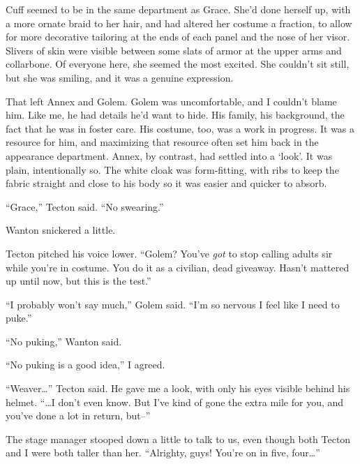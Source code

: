 Cuff seemed to be in the same department as Grace.  She'd done herself up, with a more ornate braid to her hair, and had altered her costume a fraction, to allow for more decorative tailoring at the ends of each panel and the nose of her visor.  Slivers of skin were visible between some slats of armor at the upper arms and collarbone.  Of everyone here, she seemed the most excited.  She couldn't sit still, but she was smiling, and it was a genuine expression.



That left Annex and Golem.  Golem was uncomfortable, and I couldn't blame him.  Like me, he had details he'd want to hide.  His family, his background, the fact that he was in foster care.  His costume, too, was a work in progress.  It was a resource for him, and maximizing that resource often set him back in the appearance department.  Annex, by contrast, had settled into a `look'.  It was plain, intentionally so.  The white cloak was form-fitting, with ribs to keep the fabric straight and close to his body so it was easier and quicker to absorb.



``Grace,'' Tecton said.  ``No swearing.''



Wanton snickered a little.



Tecton pitched his voice lower.  ``Golem?  You've \emph{got} to stop calling adults sir while you're in costume.  You do it as a civilian, dead giveaway.  Hasn't mattered up until now, but this is the test.''



``I probably won't say much,'' Golem said.  ``I'm so nervous I feel like I need to puke.''



``No puking,'' Wanton said.



``No puking is a good idea,'' I agreed.



``Weaver\ldots'' Tecton said.  He gave me a look, with only his eyes visible behind his helmet.  ``\ldots{}I don't even know.  But I've kind of gone the extra mile for you, and you've done a lot in return, but--''



The stage manager stooped down a little to talk to us, even though both Tecton and I were both taller than her.  ``Alrighty, guys!  You're on in five, four\ldots''




